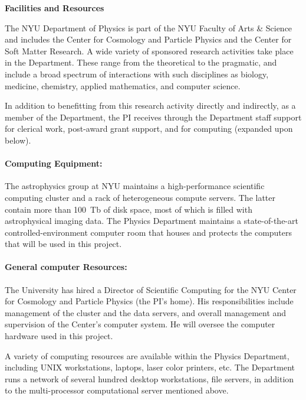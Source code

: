 \documentclass[12pt]{article}
\begin{document}
\sloppy\sloppypar\thispagestyle{empty}

\noindent
\textsf{\textbf{Facilities and Resources}}
\smallskip

The NYU Department of Physics is part of the NYU Faculty of Arts \&
Science and includes the Center for Cosmology and Particle Physics and
the Center for Soft Matter Research.  A wide variety of sponsored
research activities take place in the Department.  These range from
the theoretical to the pragmatic, and include a broad spectrum of
interactions with such disciplines as biology, medicine, chemistry,
applied mathematics, and computer science.

In addition to benefitting from this research activity directly and
indirectly, as a member of the Department, the PI receives through the
Department staff support for clerical work, post-award grant support,
and for computing (expanded upon below).

\paragraph{Computing Equipment:}

The astrophysics group at NYU maintains a high-performance scientific
computing cluster and a rack of heterogeneous compute servers.  The
latter contain more than 100~Tb of disk space, most of which is filled
with astrophysical imaging data.  The Physics Department maintains a
state-of-the-art controlled-environment computer room that houses and
protects the computers that will be used in this project.

\paragraph{General computer Resources:}

The University has hired a Director of Scientific Computing for the
NYU Center for Cosmology and Particle Physics (the PI's home).  His
responsibilities include management of the cluster and the data
servers, and overall management and supervision of the Center's
computer system.  He will oversee the computer hardware used in this
project.

A variety of computing resources are available within the Physics
Department, including UNIX workstations, laptops, laser color
printers, etc.  The Department runs a network of several hundred
desktop workstations, file servers, in addition to the multi-processor
computational server mentioned above.
\end{document}
